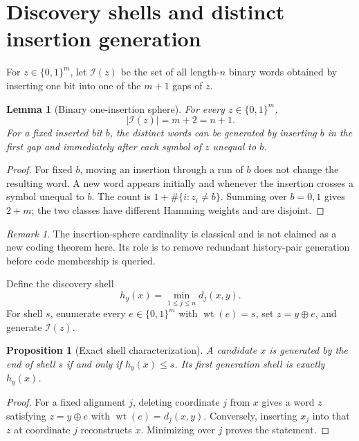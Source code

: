\documentclass[11pt]{article}
\newtheorem{proposition}[theorem]{Proposition}
\newtheorem{lemma}[theorem]{Lemma}
\theoremstyle{remark}
\newtheorem{remark}[theorem]{Remark}
\newcommand{\I}{\mathcal I}
\newcommand{\wt}{\operatorname{wt}}
\begin{document}
\section{Discovery shells and distinct insertion generation}
For $z\in\{0,1\}^{m}$, let $\I(z)$ be the set of all length-$n$ binary words obtained by inserting
one bit into one of the $m+1$ gaps of $z$.

\begin{lemma}[Binary one-insertion sphere]
For every $z\in\{0,1\}^{m}$,
\[
 |\I(z)|=m+2=n+1.
\]
For a fixed inserted bit $b$, the distinct words can be generated by inserting $b$ in the first
gap and immediately after each symbol of $z$ unequal to $b$.
\end{lemma}
\begin{proof}
For fixed $b$, moving an insertion through a run of $b$ does not change the resulting word.  A new
word appears initially and whenever the insertion crosses a symbol unequal to $b$.  The count is
$1+\#\{i:z_i\ne b\}$.  Summing over $b=0,1$ gives $2+m$; the two classes have different Hamming
weights and are disjoint.
\end{proof}
\begin{remark}
The insertion-sphere cardinality is classical and is not claimed as a new coding theorem here.  Its
role is to remove redundant history-pair generation before code membership is queried.
\end{remark}

Define the discovery shell
\[
 h_y(x)=\min_{1\le j\le n}d_j(x,y).
\]
For shell $s$, enumerate every $e\in\{0,1\}^{m}$ with $\wt(e)=s$, set $z=y\oplus e$, and generate
$\I(z)$.

\begin{proposition}[Exact shell characterization]
A candidate $x$ is generated by the end of shell $s$ if and only if $h_y(x)\le s$.  Its first
generation shell is exactly $h_y(x)$.
\end{proposition}
\begin{proof}
For a fixed alignment $j$, deleting coordinate $j$ from $x$ gives a word $z$ satisfying
$z=y\oplus e$ with $\wt(e)=d_j(x,y)$. Conversely, inserting $x_j$ into that $z$ at coordinate $j$
reconstructs $x$. Minimizing over $j$ proves the statement.
\end{proof}
\end{document}
